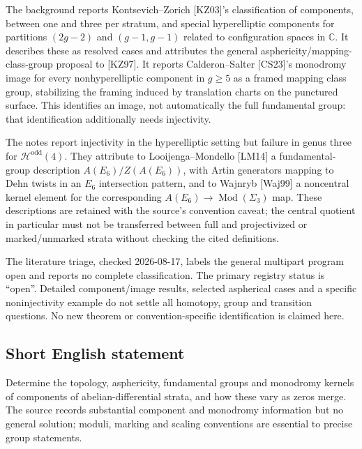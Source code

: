 \documentclass[11pt]{article}
\newcommand{\C}{\mathbb{C}}
\begin{document}
The background reports Kontsevich--Zorich [KZ03]'s classification of components, between one and three per stratum, and special hyperelliptic components for partitions $(2g-2)$ and $(g-1,g-1)$ related to configuration spaces in $\C$. It describes these as resolved cases and attributes the general asphericity/mapping-class-group proposal to [KZ97]. It reports Calderon--Salter [CS23]'s monodromy image for every nonhyperelliptic component in $g\geq5$ as a framed mapping class group, stabilizing the framing induced by translation charts on the punctured surface. This identifies an image, not automatically the full fundamental group: that identification additionally needs injectivity.

The notes report injectivity in the hyperelliptic setting but failure in genus three for $\mathcal H^{\mathrm{odd}}(4)$. They attribute to Looijenga--Mondello [LM14] a fundamental-group description $A(E_6)/Z(A(E_6))$, with Artin generators mapping to Dehn twists in an $E_6$ intersection pattern, and to Wajnryb [Waj99] a noncentral kernel element for the corresponding $A(E_6)\to\operatorname{Mod}(\Sigma_3)$ map. These descriptions are retained with the source's convention caveat; the central quotient in particular must not be transferred between full and projectivized or marked/unmarked strata without checking the cited definitions.

The literature triage, checked 2026-08-17, labels the general multipart program open and reports no complete classification. The primary registry status is ``open''. Detailed component/image results, selected aspherical cases and a specific noninjectivity example do not settle all homotopy, group and transition questions. No new theorem or convention-specific identification is claimed here.
\subsection{Short English statement}
Determine the topology, asphericity, fundamental groups and monodromy kernels of components of abelian-differential strata, and how these vary as zeros merge. The source records substantial component and monodromy information but no general solution; moduli, marking and scaling conventions are essential to precise group statements.
\end{document}
